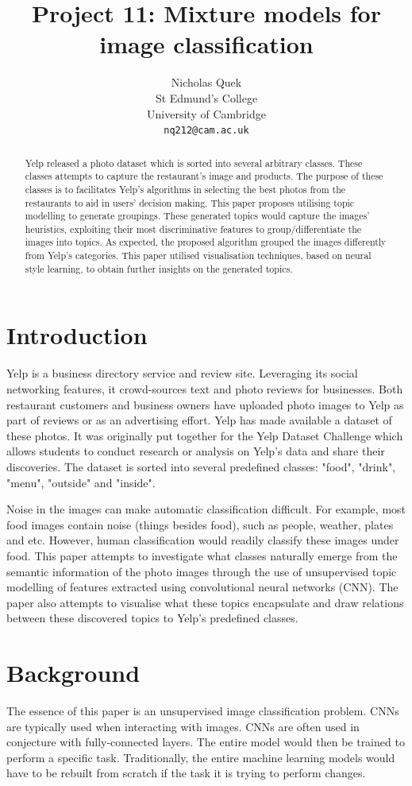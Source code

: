 \documentclass{article}
\title{Project 11: Mixture models for image classification}
\author{%
  Nicholas Quek \\
  St Edmund's College\\
  University of Cambridge\\
  \texttt{nq212@cam.ac.uk} \\
}
\begin{document}
\maketitle

\begin{abstract}
Yelp released a photo dataset which is sorted into several arbitrary classes. These classes attempts to capture the restaurant's image and products. The purpose of these classes is to facilitates Yelp's algorithms in selecting the best photos from the restaurants to aid in users' decision making. This paper proposes utilising topic modelling to generate groupings. These generated topics would capture the images' heuristics, exploiting their most discriminative features to group/differentiate the images into topics. As expected, the proposed algorithm grouped the images differently from Yelp's categories. This paper utilised visualisation techniques, based on neural style learning, to obtain further insights on the generated topics. 
\end{abstract}

\section{Introduction}
Yelp is a business directory service and review site. Leveraging its social networking features, it crowd-sources text and photo reviews for businesses. Both restaurant customers and business owners have uploaded photo images to Yelp as part of reviews or as an advertising effort. Yelp has made available a dataset of these photos. It was originally put together for the Yelp Dataset Challenge which allows students to conduct research or analysis on Yelp's data and share their discoveries. The dataset is sorted into several predefined classes: "food", "drink", "menu", "outside" and "inside". 

Noise in the images can make automatic classification difficult. For example, most food images contain noise (things besides food), such as people, weather, plates and etc. However, human classification would readily classify these images under food. This paper attempts to investigate what classes naturally emerge from the semantic information of the photo images through the use of unsupervised topic modelling of features extracted using convolutional neural networks (CNN). The paper also attempts to visualise what these topics encapsulate and draw relations between these discovered topics to Yelp's predefined classes.

\section{Background}
The essence of this paper is an unsupervised image classification problem. CNNs are typically used when interacting with images. CNNs are often used in conjecture with fully-connected layers. The entire model would then be trained to perform a specific task. Traditionally, the entire machine learning models would have to be rebuilt from scratch if the task it is trying to perform changes.  
\end{document}
